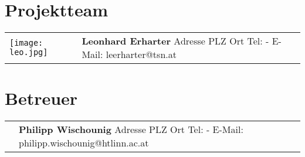 \section*{Projektteam}
\label{proteam}

\begin{tabular}[t]{p{2cm} p{5cm}}
    \vspace{0pt}
    \texttt{[image: leo.jpg]}
    &
    \vspace{0pt}
    \textbf{Leonhard Erharter} 
    \newline Adresse
    \newline PLZ Ort
    \newline
    \newline Tel: -
    \newline E-Mail: leerharter@tsn.at
    \\
\end{tabular}

\section*{Betreuer}

\begin{tabular}[t]{p{2cm} p{5cm}}
    \vspace{0pt}
    &
    \vspace{0pt}
    \textbf{Philipp Wischounig}
    \newline Adresse
    \newline PLZ Ort
    \newline
    \newline Tel: -
    \newline E-Mail: philipp.wischounig@htlinn.ac.at
    \\
\end{tabular} 

\newpage